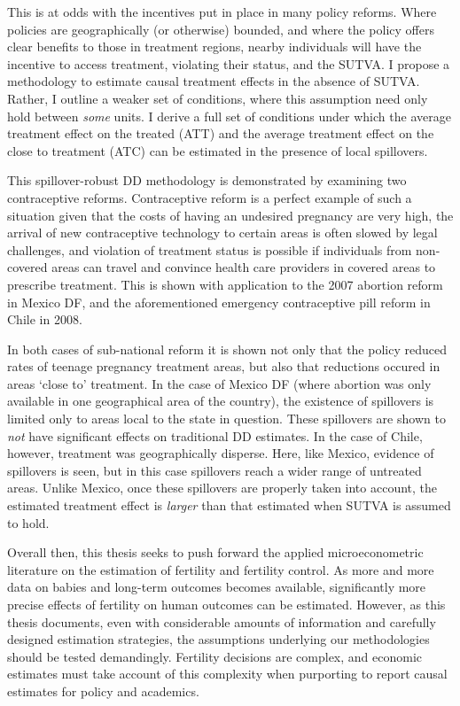 This is at odds with the incentives put in place in many policy reforms. Where
policies are geographically (or otherwise) bounded, and where the policy offers
clear benefits to those in treatment regions, nearby individuals will have the
incentive to access treatment, violating their status, and the SUTVA. I propose
a methodology to estimate causal treatment effects in the absence of SUTVA.
Rather, I outline a weaker set of conditions, where this assumption need only 
hold between \emph{some} units.  I derive a full set of conditions under which 
the average treatment effect on the treated (ATT) and the average treatment 
effect on the close to treatment (ATC) can be estimated in the presence of
local spillovers.

This spillover-robust DD methodology is demonstrated by examining two 
contraceptive reforms.  Contraceptive reform is a perfect example of such a 
situation given that the costs of having an undesired pregnancy are very high, 
the arrival of new contraceptive technology to certain areas is often slowed by 
legal challenges, and violation of treatment status is possible if individuals 
from non-covered areas can travel and convince health care providers in covered 
areas to prescribe treatment. This is shown with application to the 2007 abortion 
reform in Mexico DF, and the aforementioned emergency contraceptive pill reform 
in Chile in 2008.

In both cases of sub-national reform it is shown not only that the policy 
reduced rates of teenage pregnancy treatment areas, but also that reductions
occured in areas `close to' treatment.  In the case of Mexico DF (where 
abortion was only available in one geographical area of the country), the 
existence of spillovers is limited only to areas local to the state in question.
These spillovers are shown to \emph{not} have significant effects on traditional
DD estimates.  In the case of Chile, however, treatment was geographically 
disperse. Here, like Mexico, evidence of spillovers is seen, but in this case
spillovers reach a wider range of untreated areas. Unlike Mexico, once these 
spillovers are properly taken into account, the estimated treatment effect is 
\emph{larger} than that estimated when SUTVA is assumed to hold.

Overall then, this thesis seeks to push forward the applied microeconometric 
literature on the estimation of fertility and fertility control.  As more and
more data on babies and long-term outcomes becomes available, significantly
more precise effects of fertility on human outcomes can be estimated.  However,
as this thesis documents, even with considerable amounts of information and
carefully designed estimation strategies, the assumptions underlying our 
methodologies should be tested demandingly.  Fertility decisions are complex, 
and economic estimates must take account of this complexity when purporting to
report causal estimates for policy and academics.
